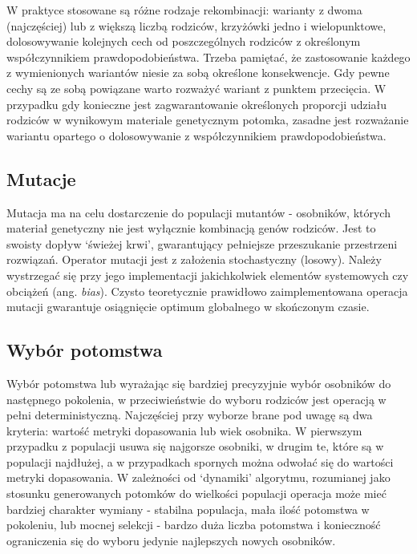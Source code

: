 \documentclass[a4paper,12pt]{article}
\numberwithin{figure}{section}
\begin{document}
    \bigskip

    W praktyce stosowane są różne rodzaje rekombinacji: warianty z dwoma (najczęściej) lub z większą liczbą rodziców, krzyżówki jedno i wielopunktowe, dolosowywanie kolejnych cech od poszczególnych rodziców z określonym współczynnikiem prawdopodobieństwa. Trzeba pamiętać, że zastosowanie każdego z wymienionych wariantów niesie za sobą określone konsekwencje. Gdy pewne cechy są ze sobą powiązane warto rozważyć wariant z punktem przecięcia. W przypadku gdy konieczne jest zagwarantowanie określonych proporcji udziału rodziców w wynikowym materiale genetycznym potomka, zasadne jest rozważanie wariantu opartego o dolosowywanie z współczynnikiem prawdopodobieństwa\cite{IntroductionToEvolutionaryComputing2015}.

    \subsection{Mutacje}

    Mutacja ma na celu dostarczenie do populacji mutantów - osobników, których materiał genetyczny nie jest wyłącznie kombinacją genów rodziców. Jest to swoisty dopływ `świeżej krwi', gwarantujący pełniejsze przeszukanie przestrzeni rozwiązań. Operator mutacji jest z założenia stochastyczny (losowy). Należy wystrzegać się przy jego implementacji jakichkolwiek elementów systemowych czy obciążeń (ang. \textit{bias}). Czysto teoretycznie prawidłowo zaimplementowana operacja mutacji gwarantuje osiągnięcie optimum globalnego w skończonym czasie\cite{IntroductionToEvolutionaryComputing2015}.

    \subsection{Wybór potomstwa}

    Wybór potomstwa lub wyrażając się bardziej precyzyjnie wybór osobników do następnego pokolenia, w przeciwieństwie do wyboru rodziców jest operacją w pełni deterministyczną. Najczęściej przy wyborze brane pod uwagę są dwa kryteria: wartość metryki dopasowania lub wiek osobnika. W pierwszym przypadku z populacji usuwa się najgorsze osobniki, w drugim te, które są w populacji najdłużej, a w przypadkach spornych można odwołać się do wartości metryki dopasowania. W zależności od `dynamiki' algorytmu, rozumianej jako stosunku generowanych potomków do wielkości populacji operacja może mieć bardziej charakter wymiany - stabilna populacja, mała ilość potomstwa w pokoleniu, lub mocnej selekcji - bardzo duża liczba potomstwa i konieczność ograniczenia się do wyboru jedynie najlepszych nowych osobników\cite{IntroductionToEvolutionaryComputing2015}.
\end{document}
